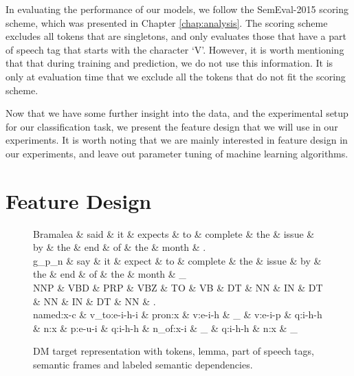 In evaluating the performance of our models, we follow the SemEval-2015 scoring scheme, which was presented in Chapter \ref{chap:analysis}. The scoring scheme excludes all tokens that are singletons, and only evaluates those that have a part of speech tag that starts with the character `V'. However, it is worth mentioning that that during training and prediction, we do not use this information. It is only at evaluation time that we exclude all the tokens that do not fit the scoring scheme.

Now that we have some further insight into the data, and the experimental setup for our classification task, we present the feature design that we will use in our experiments. It is worth noting that we are mainly interested in feature design in our experiments, and leave out parameter tuning of machine learning algorithms.

\section{Feature Design}
\label{features}

\begin{figure}
    \centering
    \smaller[]
    \smaller[]
    \smaller[]
    \begin{dependency}[]
        \begin{deptext}[column sep=0.5em, row sep=.1ex]
            Bramalea \& said \& it \& expects \& to \& complete \& the \& issue \& by \& the \& end \& of \& the \& month \& . \\
            
            g\_p\_n \& say \& it \& expect \& to \& complete \& the \& issue \& by \& the \& end \& of \& the \& month \& \_ \\
            
            NNP \& VBD \& PRP \& VBZ \& TO \& VB \& DT \& NN \& IN \& DT \& NN \& IN \& DT \& NN \& . \\
            
            named:x-c \& v\_to:e-i-h-i \& pron:x \& v:e-i-h \& \_ \& v:e-i-p \& q:i-h-h \& n:x \& p:e-u-i \& q:i-h-h \& n\_of:x-i \& \_ \& q:i-h-h \& n:x \& \_ \\
        \end{deptext}
    \end{dependency}
    \caption{DM target representation with tokens, lemma, part of speech tags, semantic frames and labeled semantic dependencies.}
    \label{DM:all}
\end{figure}

